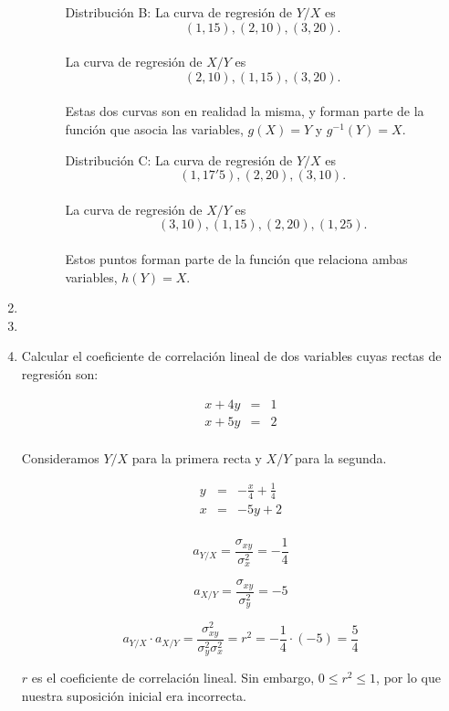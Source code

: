 \documentclass[10pt,a4paper]{article}
\begin{document}
\begin{enumerate}
\begin{itemize}
\begin{itemize}
\item[Distribución B:]La curva de regresión de $Y/X$ es $$(1,15), (2,10), (3,20).$$
\\La curva de regresión de $X/Y$ es $$(2,10), (1,15), (3,20).$$
\\Estas dos curvas son en realidad la misma, y forman parte de la función que asocia las variables, $g(X) = Y$ y $g^{-1}(Y) = X$.

\item[Distribución C:]La curva de regresión de $Y/X$ es $$(1, 17'5), (2, 20), (3, 10).$$
\\La curva de regresión de $X/Y$ es $$(3, 10), (1, 15), (2, 20), (1, 25).$$
\\Estos puntos forman parte de la función que relaciona ambas variables, $h(Y) = X$.

\end{itemize}

\end{itemize}

\newpage

\item
\newpage

\item
\newpage

\item Calcular el coeficiente de correlación lineal de dos variables cuyas rectas de regresión son:

\[
\begin{array}{lll}
x + 4y & = & 1\\
x + 5y & = & 2\\
\end{array}
\]

Consideramos $Y/X$ para la primera recta y $X/Y$ para la segunda.

\[
\begin{array}{lll}
y & = & -\frac{x}{4} + \frac{1}{4}\\
x & = & -5y + 2\\
\end{array}
\]

$$a_{Y/X} = \frac{\sigma_{xy}}{\sigma^2_x} = -\frac{1}{4}$$

$$a_{X/Y} = \frac{\sigma_{xy}}{\sigma^2_y} = -5$$

$$a_{Y/X} \cdot a_{X/Y} = \frac{\sigma^2_{xy}}{\sigma^2_y \sigma^2_x} = r^2 = -\frac{1}{4} \cdot (-5) = \frac{5}{4}$$

$r$ es el coeficiente de correlación lineal. Sin embargo, $0 \leq r^2 \leq 1$, por lo que nuestra suposición inicial era incorrecta.


\end{enumerate}
\end{document}
